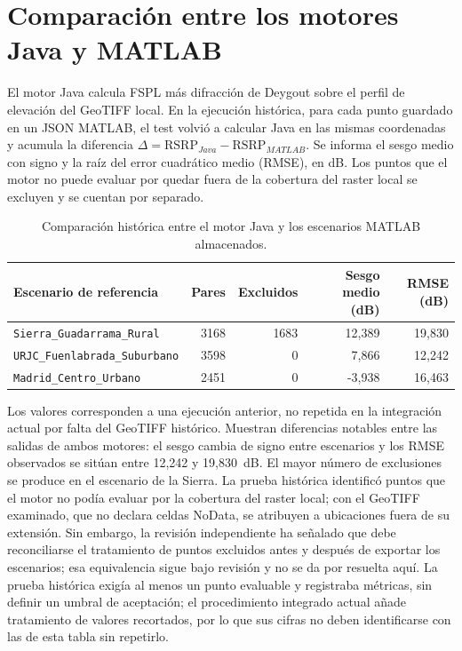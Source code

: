 \section{Comparación entre los motores Java y MATLAB}
\label{sec:comparativa}

El motor Java calcula FSPL más difracción de Deygout sobre el perfil de elevación del
GeoTIFF local. En la ejecución histórica, para cada punto guardado en un JSON MATLAB,
el test volvió a calcular Java
en las mismas coordenadas y acumula la diferencia
$\Delta=\mathrm{RSRP}_{Java}-\mathrm{RSRP}_{MATLAB}$. Se informa el sesgo medio con signo
y la raíz del error cuadrático medio (RMSE), en dB. Los puntos que el motor no puede
evaluar por quedar fuera de la cobertura del raster local se excluyen y se cuentan por
separado.

\begin{table}[H]
\centering
\caption{Comparación histórica entre el motor Java y los escenarios MATLAB almacenados.}
\label{tab:comparacion_motores}
\small
\begin{tabularx}{\textwidth}{|X|r|r|r|r|}
\hline
\textbf{Escenario de referencia} & \textbf{Pares} & \textbf{Excluidos} &
\textbf{Sesgo medio (dB)} & \textbf{RMSE (dB)} \\
\hline
\texttt{Sierra\_Guadarrama\_Rural} & 3168 & 1683 & 12,389 & 19,830 \\
\texttt{URJC\_Fuenlabrada\_Suburbano} & 3598 & 0 & 7,866 & 12,242 \\
\texttt{Madrid\_Centro\_Urbano} & 2451 & 0 & -3,938 & 16,463 \\
\hline
\end{tabularx}
\end{table}

Los valores corresponden a una ejecución anterior, no repetida en la integración
actual por falta del GeoTIFF histórico. Muestran diferencias notables entre las
salidas de ambos motores: el sesgo
cambia de signo entre escenarios y los RMSE observados se sitúan entre 12,242 y
19,830~dB. El mayor número de exclusiones se produce en el escenario de la Sierra. La
prueba histórica identificó puntos que el motor no podía evaluar por la cobertura del raster
local; con el GeoTIFF examinado, que no declara celdas NoData, se atribuyen a ubicaciones
fuera de su extensión. Sin embargo, la revisión independiente ha señalado que debe
reconciliarse el tratamiento de puntos excluidos antes y después de exportar los escenarios;
esa equivalencia sigue bajo revisión y no se da por resuelta aquí. La prueba histórica
exigía al menos un punto evaluable y registraba métricas, sin definir un umbral de
aceptación; el procedimiento integrado actual añade tratamiento de valores recortados,
por lo que sus cifras no deben identificarse con las de esta tabla sin repetirlo.


